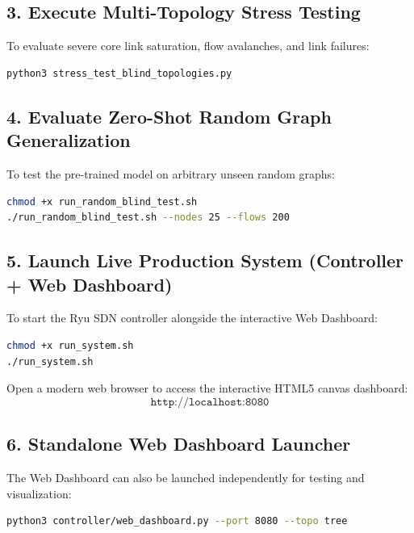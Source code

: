 \subsection{3. Execute Multi-Topology Stress Testing}
To evaluate severe core link saturation, flow avalanches, and link failures:
\begin{lstlisting}[language=bash]
python3 stress_test_blind_topologies.py
\end{lstlisting}

\subsection{4. Evaluate Zero-Shot Random Graph Generalization}
To test the pre-trained model on arbitrary unseen random graphs:
\begin{lstlisting}[language=bash]
chmod +x run_random_blind_test.sh
./run_random_blind_test.sh --nodes 25 --flows 200
\end{lstlisting}

\subsection{5. Launch Live Production System (Controller + Web Dashboard)}
To start the Ryu SDN controller alongside the interactive Web Dashboard:
\begin{lstlisting}[language=bash]
chmod +x run_system.sh
./run_system.sh
\end{lstlisting}
Open a modern web browser to access the interactive HTML5 canvas dashboard:
\begin{equation*}
    \texttt{http://localhost:8080}
\end{equation*}

\subsection{6. Standalone Web Dashboard Launcher}
The Web Dashboard can also be launched independently for testing and visualization:
\begin{lstlisting}[language=bash]
python3 controller/web_dashboard.py --port 8080 --topo tree
\end{lstlisting}

